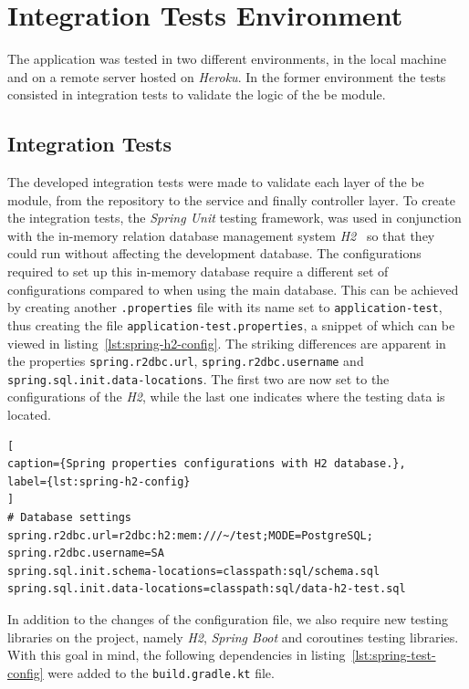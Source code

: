 \section{Integration Tests Environment}\label{ch:eval:sec:integration-tests-env}

The application was tested in two different environments, in the local machine and on a remote server hosted on \textit{Heroku}. 
In the former environment the tests consisted in integration tests to validate the logic of the \acrshort{be} module. 

\subsection{Integration Tests}
The developed integration tests were made to validate each layer of the \acrshort{be} module, from the repository to the service and finally controller layer. To create the integration tests, the \textit{Spring Unit} testing framework, was used in conjunction with the in-memory relation database management system \textit{H2}~\cite{h2-db} so that they could run without affecting the development database. The configurations required to set up this in-memory database require a different set of configurations compared to when using the main database. This can be achieved by creating another \lstinline{.properties} file with its name set to \lstinline{application-test}, thus creating the file \lstinline{application-test.properties}, a snippet of which can be viewed in listing~\ref{lst:spring-h2-config}. The striking differences are apparent in the properties \lstinline{spring.r2dbc.url}, \lstinline{spring.r2dbc.username} and \lstinline{spring.sql.init.data-locations}. The first two are now set to the configurations of the \textit{H2}, while the last one indicates where the testing data is located.

\begin{lstlisting}[
caption={Spring properties configurations with H2 database.},
label={lst:spring-h2-config}
]
# Database settings
spring.r2dbc.url=r2dbc:h2:mem:///~/test;MODE=PostgreSQL;
spring.r2dbc.username=SA
spring.sql.init.schema-locations=classpath:sql/schema.sql
spring.sql.init.data-locations=classpath:sql/data-h2-test.sql
\end{lstlisting}

In addition to the changes of the configuration file, we also require new testing libraries on the project, namely \textit{H2}, \textit{Spring Boot} and coroutines testing libraries. With this goal in mind, the following dependencies in listing~\ref{lst:spring-test-config} were added to the \lstinline{build.gradle.kt} file.

